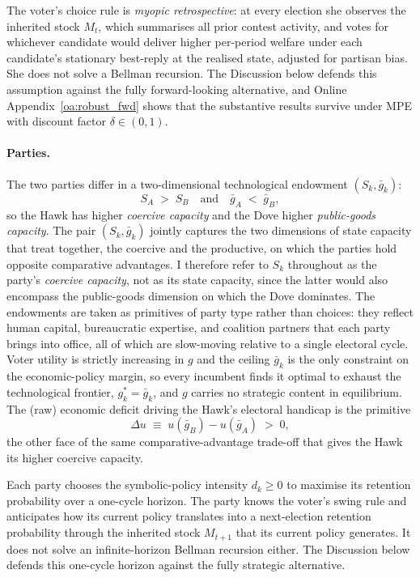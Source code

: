 \documentclass[11pt,twoside]{extarticle}
\begin{document}
The voter's choice rule is \emph{myopic retrospective}: at every election she observes the inherited stock $M_t$, which summarises all prior contest activity, and votes for whichever candidate would deliver higher per-period welfare under each candidate's stationary best-reply at the realised state, adjusted for partisan bias. She does not solve a Bellman recursion. The Discussion below defends this assumption against the fully forward-looking alternative, and Online Appendix~\ref{oa:robust_fwd} shows that the substantive results survive under MPE with discount factor $\delta\in(0,1)$.

\paragraph{Parties.} The two parties differ in a two-dimensional technological endowment $(S_k,\bar g_k)$:
\begin{equation}\label{eq:party_endowment_v3}
    S_A\;>\;S_B\quad\text{and}\quad\bar g_A\;<\;\bar g_B,
\end{equation}
so the Hawk has higher \emph{coercive capacity} and the Dove higher \emph{public-goods capacity}. The pair $(S_k,\bar g_k)$ jointly captures the two dimensions of state capacity that \citet*{besleyOriginsStateCapacity2009,besleyStateCapacityConflict2010} treat together, the coercive and the productive, on which the parties hold opposite comparative advantages. I therefore refer to $S_k$ throughout as the party's \emph{coercive capacity}, not as its state capacity, since the latter would also encompass the public-goods dimension on which the Dove dominates. The endowments are taken as primitives of party type rather than choices: they reflect human capital, bureaucratic expertise, and coalition partners that each party brings into office, all of which are slow-moving relative to a single electoral cycle. Voter utility is strictly increasing in $g$ and the ceiling $\bar g_k$ is the only constraint on the economic-policy margin, so every incumbent finds it optimal to exhaust the technological frontier, $g_k^*=\bar g_k$, and $g$ carries no strategic content in equilibrium. The (raw) economic deficit driving the Hawk's electoral handicap is the primitive
\begin{equation}\label{eq:du_v3}
    \Delta u\;\equiv\;u(\bar g_B)-u(\bar g_A)\;>\;0,
\end{equation}
the other face of the same comparative-advantage trade-off that gives the Hawk its higher coercive capacity.

Each party chooses the symbolic-policy intensity $d_k\ge 0$ to maximise its retention probability over a one-cycle horizon. The party knows the voter's swing rule and anticipates how its current policy translates into a next-election retention probability through the inherited stock $M_{t+1}$ that its current policy generates. It does not solve an infinite-horizon Bellman recursion either. The Discussion below defends this one-cycle horizon against the fully strategic alternative.
\end{document}
